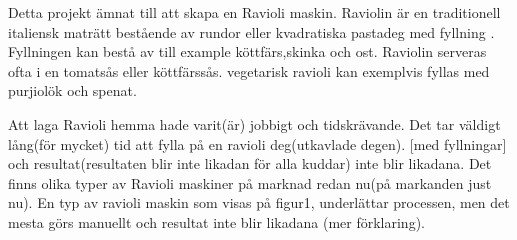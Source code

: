 Detta projekt  ämnat till att skapa en Ravioli maskin. Raviolin är en traditionell italiensk maträtt bestående av rundor eller kvadratiska pastadeg med fyllning \cite{engproc}. Fyllningen kan bestå av till example köttfärs,skinka och ost. Raviolin serveras ofta i en tomatsås eller köttfärssås. vegetarisk ravioli kan exemplvis fyllas med purjiolök och spenat. 

Att laga Ravioli hemma hade varit(är) jobbigt och tidskrävande. Det tar väldigt lång(för mycket) tid att fylla på en ravioli deg(utkavlade degen). [med fyllningar] och resultat(resultaten blir inte likadan för alla kuddar) inte blir likadana.
Det finns olika typer av Ravioli maskiner på marknad redan nu(på markanden just nu). En typ av ravioli maskin som visas på figur1, underlättar processen, men det mesta görs manuellt och resultat inte blir likadana (mer förklaring).\\

